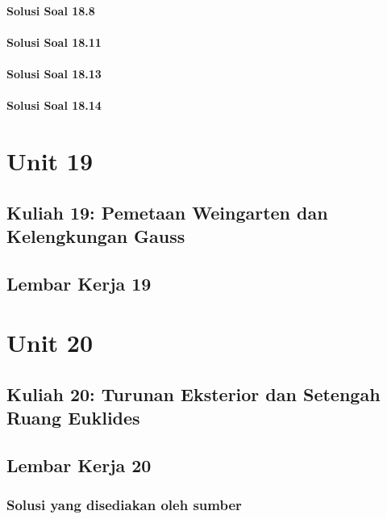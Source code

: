 \documentclass[11pt,a4paper,oneside]{book}
\begin{document}
\subsection*{Solusi Soal 18.8}

\subsection*{Solusi Soal 18.11}

\subsection*{Solusi Soal 18.13}

\subsection*{Solusi Soal 18.14}


\part{Unit 19}
\chapter[Kuliah 19]{Kuliah 19: Pemetaan Weingarten dan Kelengkungan Gauss}


\chapter{Lembar Kerja 19}


\part{Unit 20}
\chapter[Kuliah 20]{Kuliah 20: Turunan Eksterior dan Setengah Ruang Euklides}


\chapter{Lembar Kerja 20}


\section*{Solusi yang disediakan oleh sumber}
\end{document}
